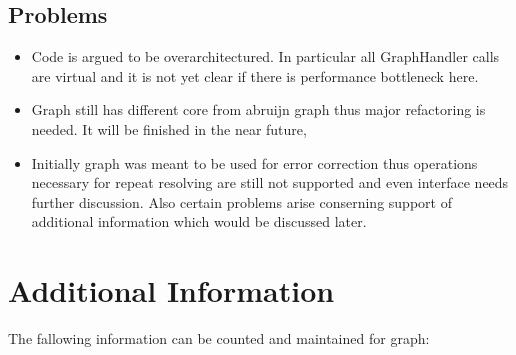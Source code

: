 \documentclass[14pt]{article}
\begin{document}
\subsection{Problems}
\begin{itemize}
\item Code is argued to be overarchitectured. In particular all GraphHandler calls are virtual and it is not yet clear if there is performance bottleneck here.
\item Graph still has different core from abruijn graph thus major refactoring is needed. It will be finished in the near future,
\item Initially graph was meant to be used for error correction thus operations necessary for repeat resolving are still not supported and even interface needs further discussion. Also certain problems arise conserning support of additional information which would be discussed later.
\end{itemize}

\section{Additional Information}
The fallowing information can be counted and maintained for graph:
\end{document}
